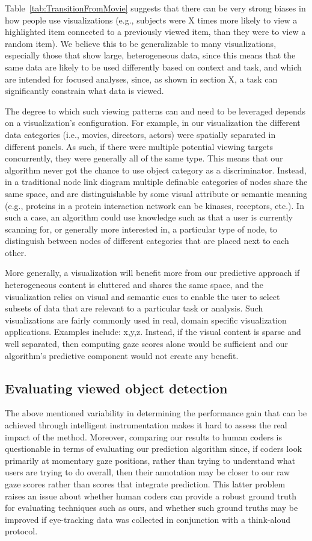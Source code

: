 Table~\ref{tab:TransitionFromMovie} suggests that there can be very strong biases in how people use visualizations (e.g., subjects were X times more likely to view a highlighted item connected to a previously viewed item, than they were to view a random item). We believe this to be generalizable to many visualizations, especially those that show large, heterogeneous data, since this means that the same data are likely to be used differently based on context and task, and which are intended for focused analyses, since, as shown in section X, a task can significantly constrain what data is viewed.  

The degree to which such viewing patterns can and need to be leveraged depends on a visualization's  configuration. For example, in our visualization the different data categories (i.e., movies, directors, actors) were spatially separated in different panels. As such, if there were multiple potential viewing targets concurrently, they were generally all of the same type. This means that our algorithm never got the chance to use object category as a discriminator. Instead, in a traditional node link diagram multiple definable categories of nodes share the same space, and are distinguishable by some visual attribute or semantic meaning (e.g., proteins in a protein interaction network can be kinases, receptors, etc.). In such a case, an algorithm could use knowledge such as that a user is currently scanning for, or generally more interested in, a particular type of node, to distinguish between nodes of different categories that are placed next to each other.  

More generally, a visualization will benefit more from our predictive approach if heterogeneous content is cluttered and shares the same space, and the visualization relies on visual and semantic cues to enable the user to select subsets of  data that are relevant to a particular task or analysis. Such visualizations are fairly commonly used in real, domain specific visualization applications. Examples include: x,y,z. Instead, if the visual content is sparse and well separated, then computing gaze scores alone would be sufficient and our algorithm's predictive component would not create any benefit.


\subsection{Evaluating viewed object detection} 

The above mentioned variability in determining the performance gain that can be achieved through intelligent instrumentation makes it hard to assess the real impact of the method. Moreover, comparing our results to human coders is questionable in terms of evaluating our prediction algorithm since, if coders look primarily at momentary gaze positions, rather than trying to understand what users are trying to do overall, then their annotation may be closer to our raw gaze scores rather than scores that integrate prediction.  This latter problem raises an issue about whether human coders can provide a robust ground truth for evaluating techniques such as ours, and whether such ground truths may be improved if eye-tracking data was collected in conjunction with a think-aloud protocol.  


